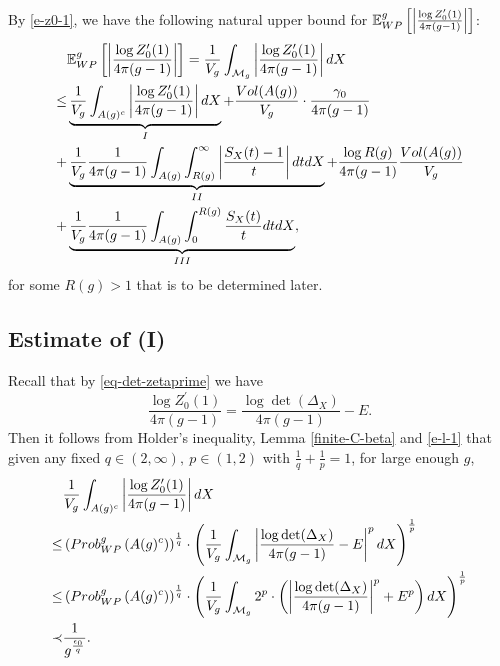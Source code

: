 \documentclass[11pt]{amsart}
\newcommand{\M}{\mathcal{M}}
\newcommand{\eps}{\epsilon}
\newcommand{\E}{\mathbb{E}_{\rm WP}^g}
\def\Vol{\mathop{\rm Vol}}
\def\Prob{\mathop{\rm Prob}\nolimits_{\rm WP}^g}
\theoremstyle{plain}
\theoremstyle{definition}
\theoremstyle{remark}
\begin{document}
\noindent By \eqref{e-z0-1}, we have the following natural upper bound for $\E\left[\left|\frac{\log Z_0^\prime(1)}{4\pi(g-1)}\right|\right]$:
\begin{equation}\label{eq-sep log Z_0^prime}
    \begin{aligned}
       & \E\left[\left|\frac{\log Z_0^\prime(1)}{4\pi(g-1)}\right|\right]=\frac{1}{V_g}\int_{\M_g}\left|\frac{\log Z_0^\prime(1)}{4\pi(g-1)} \right| dX\\
        \leq & \underbrace{\frac{1}{V_g}\int_{A(g)^c}\left|\frac{\log Z_0^\prime(1)}{4\pi(g-1)}\right| dX}_{\rm I}+\frac{\Vol(A(g))}{V_g}\cdot \frac{\gamma_0}{4\pi(g-1)}\\
        +&\underbrace{\frac{1}{V_g}\frac{1}{4\pi(g-1)}\int_{A(g)}\int_{R(g)}^\infty \left|\frac{S_X(t)-1}{t}\right|dtdX}_{\rm{II}}+\frac{\log R(g)}{4\pi(g-1)}\frac{\Vol(A(g))}{V_g}\\
         +&\underbrace{\frac{1}{V_g}\frac{1}{4\pi(g-1)}\int_{A(g)}\int_0^{R(g)} \frac{S_X(t)}{t}dtdX}_{\rm{III}},\\
    \end{aligned}
\end{equation}
for some $R(g)>1$ that is to be determined later.




\subsection{Estimate of (\rm{I})} Recall that by \eqref{eq-det-zetaprime} we have
\[\frac{\log Z_0^\prime(1)}{4\pi(g-1)}=\frac{\log\det(\Delta_X)}{4\pi(g-1)}-E.\]
Then   it follows from Holder's inequality, Lemma \ref{finite-C-beta} and \eqref{e-l-1} that given any fixed $q\in (2,\infty),\ p\in (1,2)$ with $\frac{1}{q}+\frac{1}{p}=1$,  for large enough $g$,
\begin{equation}\label{bound-(a)}
\begin{aligned}
    & \frac{1}{V_g} \int_{A(g)^c}\left|\frac{\log Z_0^\prime(1)}{4\pi(g-1)}\right|dX\\
    \leq & \left(
    \Prob\left(A(g)^c\right)
    \right)^{\frac{1}{q}} \cdot \left(  
 \frac{1}{V_g}\int_{\M_g} \left|\frac{\log\det(\Delta_X)}{4\pi(g-1)}-E\right|^p dX\right)^{\frac{1}{p}}\\
\leq &\left(
    \Prob\left(A(g)^c\right)
    \right)^{\frac{1}{q}} \cdot \left(  
 \frac{1}{V_g}\int_{\M_g} 2^p \cdot \left(\left|\frac{\log\det(\Delta_X)}{4\pi(g-1)}\right|^p+E^p\right) dX\right)^{\frac{1}{p}}\\
    \prec & \frac{1}{g^{\frac{\eps_0}{q}}}.\\
\end{aligned}
\end{equation}
\end{document}
